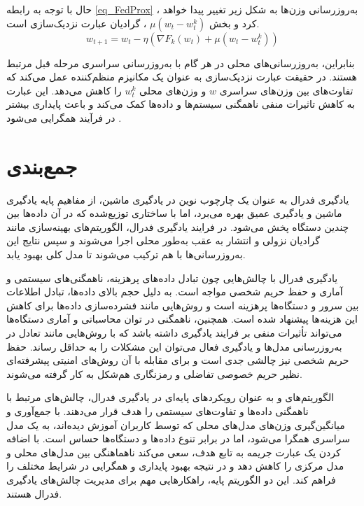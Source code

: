 حال با توجه به رابطه
\eqref{eq_FedProx}%
، به‌روزرسانی وزن‌ها به شکل زیر تغییر پیدا خواهد کرد و بخش
$\mu (w_t - w_t^k)$%
، گرادیان عبارت نزدیک‌‌سازی است.
\begin{equation}
w_{t+1} = w_t - \eta (\nabla F_k(w_t) + \mu (w_t - w_t^k))
\end{equation}

بنابراین، به‌روزرسانی‌های محلی در هر گام با به‌روزرسانی سراسری مرحله قبل مرتبط هستند. در حقیقت عبارت نزدیک‌سازی به عنوان یک مکانیزم منظم‌کننده%
عمل می‌کند که تفاوت‌های بین وزن‌های سراسری
$w$
و وزن‌های محلی
$w_t^k$
را کاهش می‌دهد. این عبارت به کاهش تاثیرات منفی ناهمگنی سیستم‌ها و داده‌ها کمک می‌کند و باعث پایداری بیشتر در فرآیند همگرایی می‌شود
\cite{li2020federatedheteroneneous}.


\section{جمع‌بندی}
یادگیری فدرال به عنوان یک چارچوب نوین در یادگیری ماشین، از مفاهیم پایه یادگیری ماشین و یادگیری عمیق بهره می‌برد، اما با ساختاری توزیع‌شده که در آن داده‌ها بین چندین دستگاه پخش می‌شود. در فرایند یادگیری فدرال، الگوریتم‌های بهینه‌سازی مانند گرادیان نزولی و انتشار به عقب به‌طور محلی اجرا می‌شوند و سپس نتایج این به‌روزرسانی‌ها با هم ترکیب می‌شوند تا مدل کلی بهبود یابد.

یادگیری فدرال با چالش‌هایی چون تبادل داده‌های پرهزینه، ناهمگنی‌های سیستمی و آماری و حفظ حریم شخصی مواجه است. به دلیل حجم بالای داده‌ها، تبادل اطلاعات بین سرور و دستگاه‌ها پرهزینه است و روش‌هایی مانند فشرده‌سازی داده‌ها برای کاهش این هزینه‌ها پیشنهاد شده است. همچنین، ناهمگنی در توان محاسباتی و آماری دستگاه‌ها می‌تواند تأثیرات منفی بر فرایند یادگیری داشته باشد که با روش‌هایی مانند تعادل در به‌روزرسانی مدل‌ها و یادگیری فعال می‌توان این مشکلات را به حداقل رساند. حفظ حریم شخصی نیز چالشی جدی است و برای مقابله با آن روش‌های امنیتی پیشرفته‌ای نظیر حریم خصوصی تفاضلی و رمزنگاری هم‌شکل به کار گرفته می‌شوند.

الگوریتم‌های
و
به عنوان رویکردهای پایه‌ای در یادگیری فدرال، چالش‌های مرتبط با ناهمگنی داده‌ها و تفاوت‌های سیستمی را هدف قرار می‌دهند.
با جمع‌آوری و میانگین‌گیری وزن‌های مدل‌های محلی که توسط کاربران آموزش دیده‌اند، به یک مدل سراسری همگرا می‌شود، اما در برابر تنوع داده‌ها و دستگاه‌ها حساس است.
با اضافه کردن یک عبارت جریمه به تابع هدف، سعی می‌کند ناهماهنگی بین مدل‌های محلی و مدل مرکزی را کاهش دهد و در نتیجه بهبود پایداری و همگرایی در شرایط مختلف را فراهم کند. این دو الگوریتم پایه، راهکارهایی مهم برای مدیریت چالش‌های یادگیری فدرال هستند.